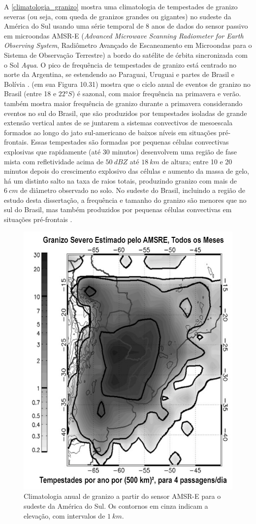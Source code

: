 A \autoref{climatologia_granizo} mostra uma climatologia de tempestades de granizo severas (ou seja, com queda de granizos grandes ou gigantes) no sudeste da América do Sul usando uma série temporal de 8 anos de dados do sensor passivo em microondas AMSR-E (\textit{Advanced Microwave Scanning Radiometer for Earth Observing System}, Radiômetro Avançado de Escaneamento em Microondas para o Sistema de Observação Terrestre) a bordo do satélite de órbita sincronizada com o Sol \textit{Aqua}. O pico de frequência de tempestades de granizo está centrado no norte da Argentina, se estendendo ao Paraguai, Uruguai e partes de Brasil e Bolívia \cite{Cecil2012a}.  (em sua Figura 10.31) mostra que o ciclo anual de eventos de granizo no Brasil (entre 18 e $\ang{22}S$) é sazonal, com maior frequência na primavera e verão.  também mostra maior frequência de granizo durante a primavera considerando eventos no sul do Brasil, que são produzidos por tempestades isoladas de grande extensão vertical antes de se juntarem a sistemas convectivos de mesoescala formados ao longo do jato sul-americano de baixos níveis em situações pré-frontais. Essas tempestades são formadas por pequenas células convectivas explosivas que rapidamente (até 30 minutos) desenvolvem uma região de fase mista com refletividade acima de $50\:dBZ$ até $18\:km$ de altura; entre 10 e 20 minutos depois do crescimento explosivo das células e aumento da massa de gelo, há um distinto salto na taxa de raios totais, produzindo granizo com mais de $6\:cm$ de diâmetro observado no solo. No sudeste do Brasil, incluindo a região de estudo desta dissertação, a frequência e tamanho do granizo são menores que no sul do Brasil, mas também produzidos por pequenas células convectivas em situações pré-frontais \cite{Puig2017}. 

\begin{figure}[htb]
	\begin{center}
		\caption{Climatologia anual de granizo a partir do sensor AMSR-E para o sudeste da América do Sul. Os contornos em cinza indicam a elevação, com intervalos de $1\:km$.} 
		\label{climatologia_granizo}
		\includegraphics[width=0.5\columnwidth]{figs/cecil_severehail_ptbr.png}
	\end{center}
\end{figure}

